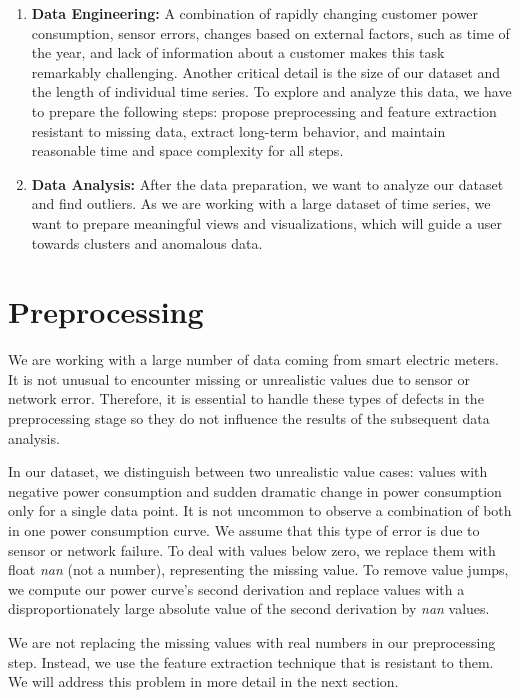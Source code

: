 \begin{enumerate}
    \item \textbf{Data Engineering:} A combination of rapidly changing customer power consumption, sensor errors, changes based on external factors, such as time of the year, and lack of information about a customer makes this task remarkably challenging. Another critical detail is the size of our dataset and the length of individual time series. To explore and analyze this data, we have to prepare the following steps: propose preprocessing and feature extraction resistant to missing data, extract long-term behavior, and maintain reasonable time and space complexity for all steps.
    \item \textbf{Data Analysis:} After the data preparation, we want to analyze our dataset and find outliers. As we are working with a large dataset of time series, we want to prepare meaningful views and visualizations, which will guide a user towards clusters and anomalous data.
\end{enumerate}

\section{Preprocessing}
We are working with a large number of data coming from smart electric meters. It is not unusual to encounter missing or unrealistic values due to sensor or network error. Therefore, it is essential to handle these types of defects in the preprocessing stage so they do not influence the results of the subsequent data analysis.

In our dataset, we distinguish between two unrealistic value cases: values with negative power consumption and sudden dramatic change in power consumption only for a single data point. It is not uncommon to observe a combination of both in one power consumption curve. We assume that this type of error is due to sensor or network failure. To deal with values below zero, we replace them with float \textit{nan} (not a number), representing the missing value. To remove value jumps, we compute our power curve's second derivation and replace values with a disproportionately large absolute value of the second derivation by \textit{nan} values.

We are not replacing the missing values with real numbers in our preprocessing step. Instead, we use the feature extraction technique that is resistant to them. We will address this problem in more detail in the next section.

